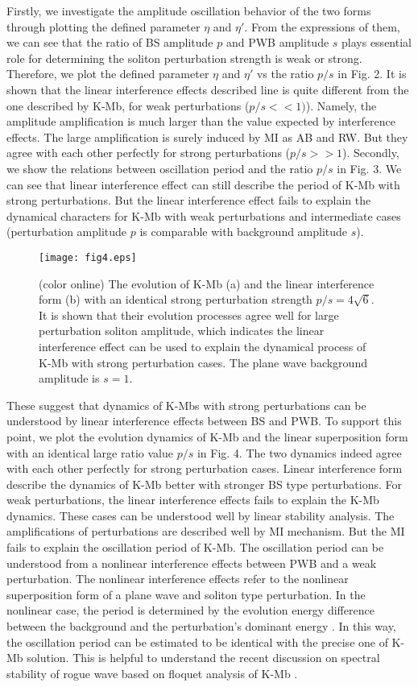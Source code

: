 \documentclass[aps,twocolumn,showpacs]{revtex4}
\begin{document}
Firstly, we investigate the amplitude oscillation behavior of the two forms through plotting the defined parameter $\eta$ and $\eta'$. From the expressions of them, we can see that the ratio of BS amplitude $p$ and PWB amplitude $s$ plays essential role for determining the soliton perturbation strength is weak or strong. Therefore, we plot the defined parameter $\eta$ and $\eta'$ vs the ratio $p/s$ in Fig. 2. It is shown that the linear interference effects described line is quite different from the one described by K-Mb, for weak perturbations ($p/s<<1)$). Namely, the amplitude amplification is much larger than the value expected by interference effects. The large amplification is surely induced by MI as AB and RW.  But they agree with each other perfectly for strong perturbations ($p/s>>1$). Secondly, we show the relations between oscillation period and the ratio $p/s$ in Fig. 3. We can see that linear interference effect can still describe the period of K-Mb with strong  perturbations. But the linear interference effect fails to explain the dynamical characters for K-Mb with weak perturbations and intermediate cases (perturbation amplitude $p$  is comparable with background amplitude $s$).

\begin{figure}[htb]
\centering
\label{fig:4}
{\texttt{[image: fig4.eps]}}
\caption{(color online) The evolution of K-Mb (a) and the linear interference form (b) with an identical strong perturbation strength $p/s=4 \sqrt{6}$. It is shown that their evolution processes  agree well for large perturbation soliton amplitude, which indicates the linear interference effect can be used to explain the dynamical process of K-Mb with strong perturbation cases. The plane wave background amplitude is $s=1$. }
\end{figure}

These suggest that dynamics of K-Mbs with strong perturbations can be understood by linear interference effects between BS and PWB. To support this point, we plot the evolution dynamics of K-Mb and the linear superposition form with an identical large ratio value $p/s$ in Fig. 4. The two dynamics indeed agree with each other perfectly for strong perturbation cases. Linear interference form describe the dynamics of K-Mb better with stronger BS type perturbations. For weak perturbations, the linear interference effects fails to explain the K-Mb dynamics. These cases can be understood well by linear stability analysis. The amplifications of perturbations are described well by MI mechanism. But the MI fails to explain the oscillation period of K-Mb. The oscillation period can be understood from a nonlinear interference effects between PWB and a weak perturbation. The nonlinear interference effects refer to the nonlinear superposition form of a plane wave and soliton type perturbation. In the nonlinear case, the period is determined by the evolution energy difference between the background and the perturbation's dominant energy  \cite{zhaoling}. In this way, the oscillation period can be estimated to be identical with the precise one of K-Mb solution. This is helpful to understand the recent discussion on spectral stability of rogue wave based on floquet analysis of K-Mb \cite{Cuevas}.
\end{document}
